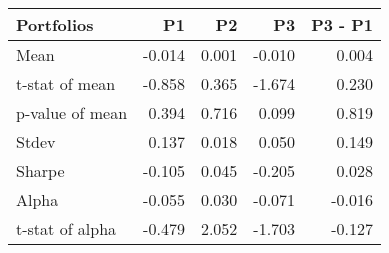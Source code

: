 \begin{tabular}{lrrrr}
\toprule
Portfolios & P1 & P2 & P3 & P3 - P1 \\
\midrule
Mean & -0.014 & 0.001 & -0.010 & 0.004 \\
t-stat of mean & -0.858 & 0.365 & -1.674 & 0.230 \\
p-value of mean & 0.394 & 0.716 & 0.099 & 0.819 \\
Stdev & 0.137 & 0.018 & 0.050 & 0.149 \\
Sharpe & -0.105 & 0.045 & -0.205 & 0.028 \\
Alpha & -0.055 & 0.030 & -0.071 & -0.016 \\
t-stat of alpha & -0.479 & 2.052 & -1.703 & -0.127 \\
\bottomrule
\end{tabular}
